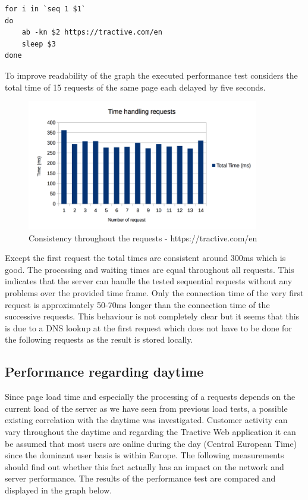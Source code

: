 \begin{lstlisting}[caption=Shell script testing consistency of requests]
for i in `seq 1 $1`
do
	ab -kn $2 https://tractive.com/en
	sleep $3
done 
\end{lstlisting}

To improve readability of the graph the executed performance test considers the total time of 15 requests of the same page each delayed by five seconds.

\begin{figure}[h]
	\centering
		\includegraphics[width=0.9\textwidth]{imgs/consistency.png}
	\caption{Consistency throughout the requests - https://tractive.com/en}
\end{figure}

Except the first request the total times are consistent around 300ms which is good. The processing and waiting times are equal throughout all requests. This indicates that the server can handle the tested sequential requests without any problems over the provided time frame. Only the connection time of the very first request is approximately 50-70ms longer than the connection time of the successive requests. This behaviour is not completely clear but it seems that this is due to a DNS lookup at the first request which does not have to be done for the following requests as the result is stored locally.  

\subsection{Performance regarding daytime}
Since page load time and especially the processing of a requests depends on the current load of the server as we have seen from previous load tests, a possible existing correlation with the daytime was investigated. Customer activity can vary throughout the daytime and regarding the Tractive Web application it can be assumed that most users are online during the day (Central European Time) since the dominant user basis is within Europe. The following measurements should find out whether this fact actually has an impact on the network and server performance. The results of the performance test are compared and displayed in the graph below.

